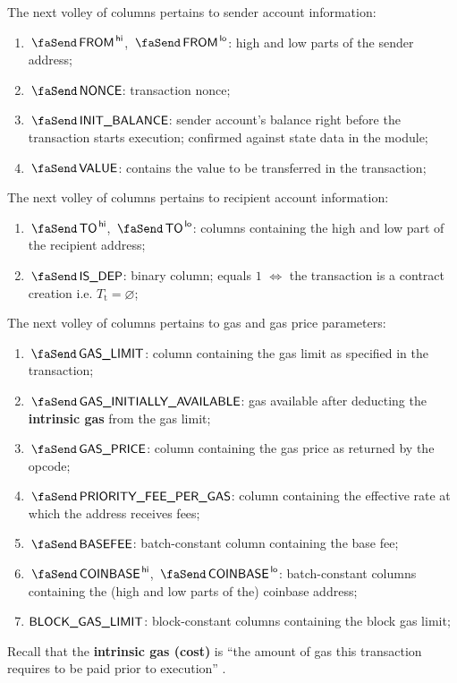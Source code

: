 The next volley of columns pertains to sender account information:
\begin{enumerate}[resume]
	\item $\txFrom\high$, $\txFrom\low$:
		\markAsExtractedFromEcrecover{}
		high and low parts of the sender address;
	\item $\txNonce$:
		\markAsExtractedFromRlpTxn{}
		transaction nonce;
	\item $\txInitialBalance$:
		\markAsExtractedFromHub{}
		\godGiven{}
		sender account's balance right before the transaction starts execution; confirmed against state data in the \hubMod{} module;
	\item $\txValue$:
		\markAsExtractedFromRlpTxn{}
		contains the value to be transferred in the transaction;
\end{enumerate}
The next volley of columns pertains to recipient account information:
\begin{enumerate}[resume]
	\item $\txTo\high$, $\txTo\low$:
		\markAsSometimesExtractedFromRlpTxn{}
		columns containing the high and low part of the recipient address;
	\item $\txIsDeployment$:
		\markAsExtractedFromRlpTxn{}
		binary column; equals $1$ $\iff$ the transaction is a contract creation i.e. $T_\text{t} = \varnothing$;
\end{enumerate}
The next volley of columns pertains to gas and gas price parameters: 
\begin{enumerate}[resume]
	\item $\txGasLimit$:
		\markAsExtractedFromRlpTxn{}
		column containing the gas limit as specified in the transaction;
	\item $\txInitialGas$:
		\markAsComputedHere{}
		gas available after deducting the \textbf{intrinsic gas} from the gas limit;
	\item $\txGasPrice$:
		\markAsComputedHere{}
		column containing the gas price as returned by the  opcode;
	\item $\txPriorityFeePerGas$:
		\markAsComputedHere{}
		column containing the effective rate at which the  address receives fees;
	\item $\txBasefee$:
		\markAsExtractedFromBtc{}
		batch-constant column containing the base fee;
	\item $\txCoinbase\high$, $\txCoinbase\low$:
		\markAsExtractedFromBtc{}
		batch-constant columns containing the (high and low parts of the) coinbase address;
	\item $\textsf{BLOCK\_GAS\_LIMIT}$:
		\markAsExtractedFromBtc{}
		block-constant columns containing the block gas limit;
\end{enumerate}
Recall that the \textbf{intrinsic gas (cost)} is ``the amount of gas this transaction requires to be paid prior to execution'' .

